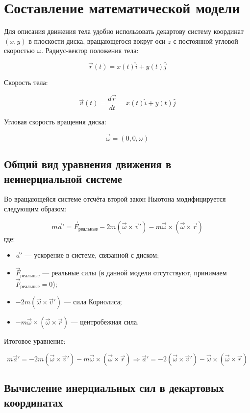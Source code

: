 \documentclass[a4paper,12pt]{article}
\begin{document}
\newpage

\section{Составление математической модели}

Для описания движения тела удобно использовать декартову систему координат $(x, y)$ в плоскости диска, вращающегося вокруг оси $z$ с постоянной угловой скоростью $\omega$. Радиус-вектор положения тела:

\[
\vec{r}(t) = x(t)\hat{i} + y(t)\hat{j}
\]

Скорость тела:

\[
\vec{v}(t) = \frac{d\vec{r}}{dt} = \dot{x}(t)\hat{i} + \dot{y}(t)\hat{j}
\]

Угловая скорость вращения диска:

\[
\vec{\omega} = (0, 0, \omega)
\]

\subsection{Общий вид уравнения движения в неинерциальной системе}

Во вращающейся системе отсчёта второй закон Ньютона модифицируется следующим образом:

\[
m \vec{a}' = \vec{F}_\text{реальные} - 2m (\vec{\omega} \times \vec{v}') - m \vec{\omega} \times (\vec{\omega} \times \vec{r})
\]
где:
\begin{itemize}
    \item $\vec{a}'$ — ускорение в системе, связанной с диском;
    \item $\vec{F}_\text{реальные}$ — реальные силы (в данной модели отсутствуют, принимаем $\vec{F}_\text{реальные} = 0$);
    \item $-2m (\vec{\omega} \times \vec{v}')$ — сила Кориолиса;
    \item $-m \vec{\omega} \times (\vec{\omega} \times \vec{r})$ — центробежная сила.
\end{itemize}
Итоговое уравнение:

\[
m \vec{a}' = -2m (\vec{\omega} \times \vec{v}') - m \vec{\omega} \times (\vec{\omega} \times \vec{r})
\Rightarrow
\vec{a}' = -2 (\vec{\omega} \times \vec{v}') - \vec{\omega} \times (\vec{\omega} \times \vec{r})
\]

\subsection{Вычисление инерциальных сил в декартовых координатах}
\end{document}
